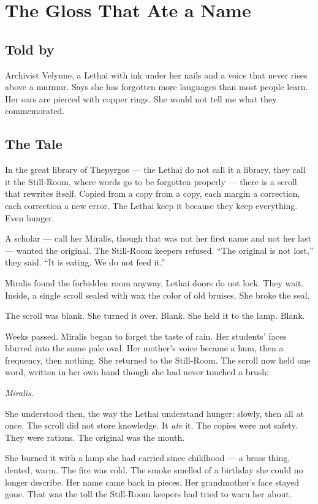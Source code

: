 \chapter{The Gloss That Ate a Name}

\section*{Told by}

Archivist Velynne, a Lethai with ink under her nails and a voice that never rises above a murmur. Says she has forgotten more languages than most people learn. Her ears are pierced with copper rings. She would not tell me what they commemorated.

\section*{The Tale}

In the great library of Thepyrgos --- the Lethai do not call it a library, they call it the Still-Room, where words go to be forgotten properly --- there is a scroll that rewrites itself. Copied from a copy from a copy, each margin a correction, each correction a new error. The Lethai keep it because they keep everything. Even hunger.

A scholar --- call her Miralis, though that was not her first name and not her last --- wanted the original. The Still-Room keepers refused. ``The original is not lost,'' they said. ``It is eating. We do not feed it.''

Miralis found the forbidden room anyway. Lethai doors do not lock. They wait. Inside, a single scroll sealed with wax the color of old bruises. She broke the seal.

The scroll was blank. She turned it over. Blank. She held it to the lamp. Blank.

Weeks passed. Miralis began to forget the taste of rain. Her students' faces blurred into the same pale oval. Her mother's voice became a hum, then a frequency, then nothing. She returned to the Still-Room. The scroll now held one word, written in her own hand though she had never touched a brush:

\textit{Miralis}.

She understood then, the way the Lethai understand hunger: slowly, then all at once. The scroll did not store knowledge. It \emph{ate} it. The copies were not safety. They were rations. The original was the mouth.

She burned it with a lamp she had carried since childhood --- a brass thing, dented, warm. The fire was cold. The smoke smelled of a birthday she could no longer describe. Her name came back in pieces. Her grandmother's face stayed gone. That was the toll the Still-Room keepers had tried to warn her about.

